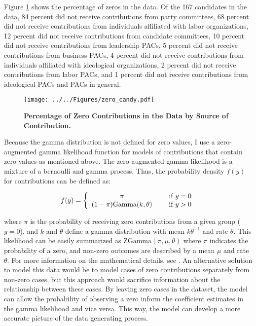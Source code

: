 \documentclass[12pt]{article}
\begin{document}
Figure \ref{fig: zeros} shows the percentage of zeros in the data. Of the 167 candidates in the data, 84 percent did not receive contributions from party committees, 68 percent did not receive contributions from individuals affiliated with labor organizations, 12 percent did not receive contributions from candidate committees, 10 percent did not receive contributions from leadership PACs, 5 percent did not receive contributions from business PACs,  4 percent did not receive contributions from individuals affiliated with ideological organizations, 2 percent did not receive contributions from labor PACs, and 1 percent did not receive contributions from ideological PACs and PACs in general.  

\begin{figure}[!htb]
    \centering
    \texttt{[image: ../../Figures/zero\_candy.pdf]}
    \caption{\textbf{Percentage of Zero Contributions in the Data by Source of Contribution.}}
    \label{fig: zeros}
\end{figure}

Because the gamma distribution is not defined for zero values, I use a zero-augmented gamma likelihood function for models of contributions that contain zero values as mentioned above. The zero-augmented gamma likelihood is a mixture of a bernoulli and gamma process. Thus, the probability density $f(y)$ for contributions can be defined as:    

\begin{align}
f(y) = \left\{ \begin{array}{cc} 
                \pi & \hspace{5mm} \text{if $y = 0$} \\
                (1 - \pi) \text{Gamma}(k, \theta) & \hspace{5mm}  \text{if $y > 0$} \\
                \end{array} \right.
\end{align}

\noindent where $\pi$ is the probability of receiving zero contributions from a given group ($y = 0$), and $k$ and $\theta$ define a gamma distribution with mean $k\theta^{-1}$ and rate $\theta$. This likelihood can be easily summarized as $\text{ZGamma}(\pi, \mu, \theta)$ where $\pi$ indicates the probability of a zero, and non-zero outcomes are described by a mean $\mu$ and rate $\theta$. For more information on the mathematical details, see \citet{mccullagn1989}. An alternative solution to model this data would be to model cases of zero contributions separately from non-zero cases, but this approach would sacrifice information about the relationship between these cases. By leaving zero cases in the dataset, the model can allow the probability of observing a zero inform the coefficient estimates in the gamma likelihood and vice versa. This way, the model can develop a more accurate picture of the data generating process.
\end{document}

